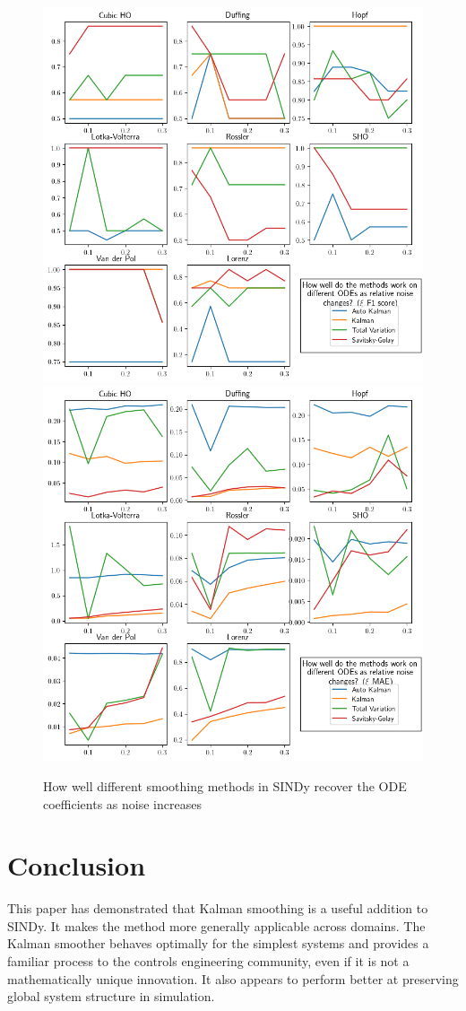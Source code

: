 \documentclass{ACCESS_latex_template_20231118/ieeeaccess}
\begin{document}
\begin{figure}
    \label{fig:noise}
    \centering
    \includegraphics[width=.65\textwidth]{images/summary_f1_noise.png}\\
    \includegraphics[width=.65\textwidth]{images/summary_mae_noise.png}
    \caption{How well different smoothing methods in SINDy recover the ODE coefficients as noise increases}
\end{figure}

\section{Conclusion}
This paper has demonstrated that Kalman smoothing is a useful addition to SINDy.  It makes the method more generally applicable across domains. The Kalman smoother behaves optimally for the simplest systems and provides a familiar process to the controls engineering community, even if it is not a mathematically unique innovation.  It also appears to perform better at preserving global system structure in simulation.
\end{document}

